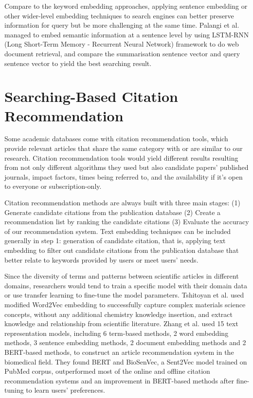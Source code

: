 Compare to the keyword embedding approaches, applying sentence embedding or other wider-level embedding techniques to search engines can better preserve information for query but be more challenging at the same time.
Palangi et al.\cite{palangi2016} managed to embed semantic information at a sentence level by using LSTM-RNN (Long Short-Term Memory - Recurrent Neural Network) framework to do web document retrieval, and compare the summarisation sentence vector and query sentence vector to yield the best searching result.


\section{Searching-Based Citation Recommendation}

Some academic databases come with citation recommendation tools, which provide relevant articles that share the same category with or are similar to our research.
Citation recommendation tools would yield different results resulting from not only different algorithms they used but also candidate papers' published journals, impact factors, times being referred to, and the availability if it's open to everyone or subscription-only.

Citation recommendation methods are always built with three main stages: (1) Generate candidate citations from the publication database (2) Create a recommendation list by ranking the candidate citations (3) Evaluate the accuracy of our recommendation system.\cite{ma2020}
Text embedding techniques can be included generally in step 1: generation of candidate citation, that is, applying text embedding to filter out candidate citations from the publication database that better relate to keywords provided by users or meet users' needs.

Since the diversity of terms and patterns between scientific articles in different domains, researchers would tend to train a specific model with their domain data or use transfer learning to fine-tune the model parameters.
Tshitoyan et al.\cite{tshitoyan2019} used modified Word2Vec embedding to successfully capture complex materials science concepts, without any additional chemistry knowledge insertion, and extract knowledge and relationship from scientific literature.
Zhang et al.\cite{zhang2022} used 15 text representation models, including 6 term-based methods, 2 word embedding methods, 3 sentence embedding methods, 2 document embedding methods and 2 BERT-based methods, to construct an article recommendation system in the biomedical field.
They found BERT and BioSenVec, a Sent2Vec model trained on PubMed corpus, outperformed most of the online and offline citation recommendation systems and an improvement in BERT-based methods after fine-tuning to learn users' preferences.

